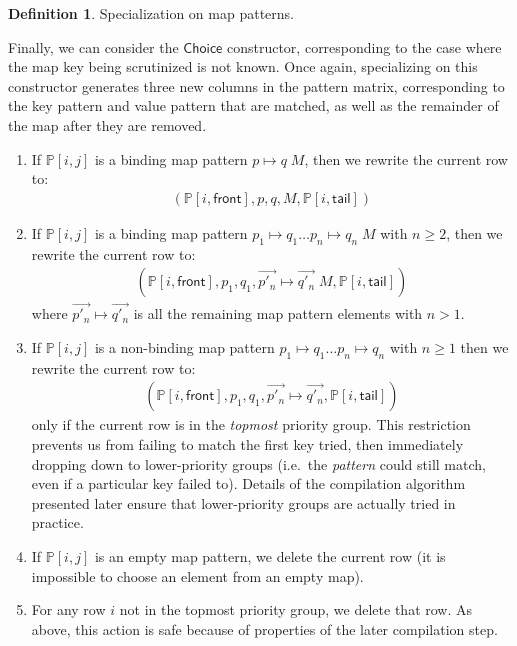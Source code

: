 \documentclass{article}
\theoremstyle{definition}
\newtheorem{definition}{Definition}[section]
\newcommand{\mapchoice}{\mathsf{Choice}}
\newcommand{\PP}{\mathbb{P}}
\newcommand{\front}{\mathsf{front}}
\newcommand{\tail}{\mathsf{tail}}
\begin{document}
\begin{definition}{Specialization on map patterns.}
\begin{enumerate}
\end{enumerate}

Finally, we can consider the $ \mapchoice $ constructor, corresponding to the
case where the map key being scrutinized is not known. Once again, specializing
on this constructor generates three new columns in the pattern matrix,
corresponding to the key pattern and value pattern that are matched, as well as
the remainder of the map after they are removed.

\begin{enumerate}

  \item If $ \PP[i, j] $ is a binding map pattern $ p \mapsto q \; M $, then we
    rewrite the current row to:
    \begin{align*}
      (\PP[i, \front], p, q, M, \PP[i, \tail])
    \end{align*}

  \item If $ \PP[i, j] $ is a binding map pattern $ p_1 \mapsto q_1 \dots p_n
    \mapsto q_n \; M $ with $ n \geq 2 $, then we rewrite the current row to:
    \begin{align*}
      (\PP[i, \front], p_1, q_1, \vec{p'_n} \mapsto \vec{q'_n} \; M, \PP[i, \tail])
    \end{align*}
    where $ \vec{p'_n} \mapsto \vec{q'_n} $ is all the remaining map pattern
    elements with $ n > 1 $.

  \item If $ \PP[i, j] $ is a non-binding map pattern $ p_1 \mapsto q_1 \dots p_n
    \mapsto q_n $ with $ n \geq 1 $ then we rewrite the current row to:
    \begin{align*}
      (\PP[i, \front], p_1, q_1, \vec{p'_n} \mapsto \vec{q'_n} , \PP[i, \tail])
    \end{align*}
    only if the current row is in the \emph{topmost} priority group. This
    restriction prevents us from failing to match the first key tried, then
    immediately dropping down to lower-priority groups (i.e.\ the \emph{pattern}
    could still match, even if a particular key failed to). Details of the
    compilation algorithm presented later ensure that lower-priority groups are
    actually tried in practice.

  \item If $ \PP[i, j] $ is an empty map pattern, we delete the current row (it
    is impossible to choose an element from an empty map).

  \item For any row $ i $  not in the topmost priority group, we delete that
    row. As above, this action is safe because of properties of the later
    compilation step.


\end{enumerate}
\end{definition}
\end{document}
